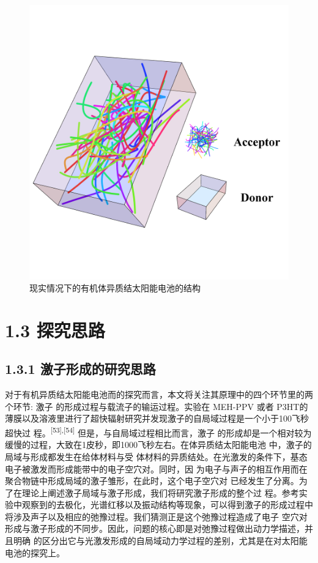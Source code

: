 \documentclass[12pt,]{report}
\begin{document}
\begin{figure}[h!]
    \centering
    \includegraphics[scale=0.8]{./figures/solar3d.png}
    \caption{现实情况下的有机体异质结太阳能电池的结构}
    \label{fig:solar3d}
\end{figure}

\section{1.3 探究思路}\label{ux63a2ux7a76ux601dux8def}

\subsection{1.3.1
激子形成的研究思路}\label{ux6fc0ux5b50ux5f62ux6210ux7684ux7814ux7a76ux601dux8def}

对于有机异质结太阳能电池而的探究而言，本文将关注其原理中的四个环节里的两个环节:
激子 的形成过程与载流子的输运过程。实验在 MEH-PPV 或者
P3HT的薄膜以及溶液里进行了超快辐射研究并发现激子的自局域过程是一个小于100飞秒超快过
程。\textsuperscript{{[}53{]},{[}54{]}} 但是，与自局域过程相比而言，激子
的形成却是一个相对较为缓慢的过程，大致在1皮秒，即1000飞秒左右。在体异质结太阳能电池
中，激子的局域与形成都发生在给体材料与受
体材料的异质结处。在光激发的条件下，基态电子被激发而形成能带中的电子空穴对。同时，因
为电子与声子的相互作用而在聚合物链中形成局域的激子雏形，在此时，这个电子空穴对
已经发生了分离。为了在理论上阐述激子局域与激子形成，我们将研究激子形成的整个过
程。参考实验中观察到的去极化，光谱红移以及振动结构等现象，可以得到激子的形成过程中
将涉及声子以及相应的弛豫过程。我们猜测正是这个弛豫过程造成了电子
空穴对形成与激子形成的不同步。因此，问题的核心即是对弛豫过程做出动力学描述，并且明确
的区分出它与光激发形成的自局域动力学过程的差别，尤其是在对太阳能电池的探究上。
\end{document}
